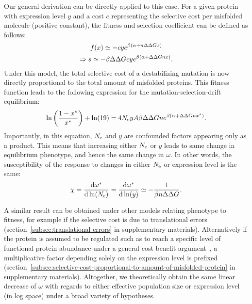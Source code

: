 Our general derivation can be directly applied to this case.
For a given protein with expression level $y$ and a cost $c$ representing the selective cost per misfolded molecule (positive constant), the fitness and selection coefficient can be defined as follows:
\begin{gather}
    f (x) \simeq - c y e^{\beta (\alpha + n \Delta \Delta G x)} \\
    \Rightarrow s \simeq - \beta \Delta \Delta G c y e^{\beta(\alpha + \Delta \Delta G n x)}.
\end{gather}
Under this model, the total selective cost of a destabilizing mutation is now directly proportional to the total amount of misfolded proteins.
This fitness function leads to the following expression for the mutation-selection-drift equilibrium:
\begin{equation}
    \ln \left( \frac{1 - x^{*}}{x^{*}} \right) + \ln (19) = 4N_{\text{e}} y A \beta \Delta \Delta G n e^{\beta(\alpha + \Delta \Delta G n x^{*})}.
\end{equation}
Importantly, in this equation, $N_{\text{e}}$ and $y$ are confounded factors appearing only as a product.
This means that increasing either $N_{\text{e}}$ or $y$ leads to same change in equilibrium \gls{phenotype}, and hence the same change in $\omega$.
In other words, the susceptibility of the response to changes in either $N_{\text{e}}$ or expression level is the same:
\begin{align}
    \chi = \frac{ \der \omega\eq}{\der \ln (\Ne)} = \frac{ \der \omega\eq}{\der \ln (y)} \simeq - \frac{1}{\beta \NbrSites \DeltaDeltaG}. \label{eq:chi_application_y}
\end{align}

A similar result can be obtained under other models relating \gls{phenotype} to fitness, for example if the selective cost is due to translational errors (section~\ref{subsec:translational-errors} in supplementary materials).
Alternatively if the protein is assumed to be regulated such as to reach a specific level of functional protein abundance under a general cost-benefit argument~\citep{Cherry2010,Gout2010}, a multiplicative factor depending solely on the expression level is prefixed (section~\ref{subsec:selective-cost-proportional-to-amount-of-misfolded-protein} in supplementary materials).
Altogether, we theoretically obtain the same linear decrease of $\omega$ with regards to either \gls{effective population size} or expression level (in log space) under a broad variety of hypotheses.


